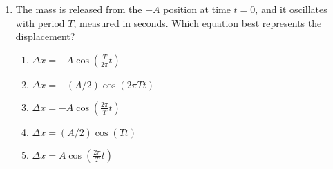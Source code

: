 \documentclass{../../../oss-apphys}
\begin{document}
\begin{multicols}{2}
\begin{enumerate}[leftmargin=18pt,resume]
  \item The mass is released from the $-A$ position at time $t=0$, and it
    oscillates with period $T$, measured in seconds. Which equation best
    represents the displacement?
    \label{four}
    \begin{enumerate}[noitemsep,topsep=0pt,leftmargin=18pt,label=(\Alph*)]
    \item $\displaystyle \Delta x = -A\cos\left(\frac{T}{2\pi}t\right)$
    \item $\displaystyle \Delta x = -(A/2)\cos(2\pi T t)$
    \item $\displaystyle \Delta x = -A\cos\left(\frac{2\pi}{T}t\right)$
    \item $\displaystyle \Delta x = (A/2)\cos(T t)$
    \item $\displaystyle \Delta x = A\cos\left(\frac{2\pi}{T}t\right)$
    \end{enumerate}
    
   
%  



\end{enumerate}
\end{multicols}
\end{document}

